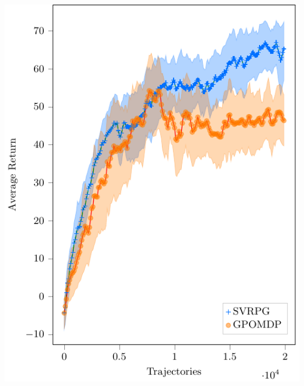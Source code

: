 \documentclass[aspectratio=169]{beamer}
\begin{document}
\begin{frame}
\begin{minipage}[t]{.28\paperwidth}
\includegraphics[width=\textwidth]{images/swimmer.pdf}
\end{minipage}


\end{frame}
\end{document}
